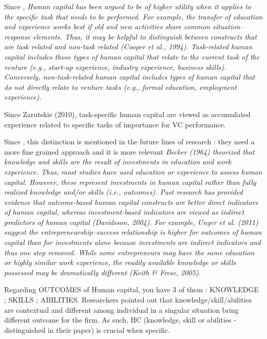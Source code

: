 Since \citep{marvel2016human}, \textit{Human capital has been argued to be of higher utility when it applies to the specific task that needs to be performed. For example, the transfer of education and experience works best if old and new activities share common situation–response elements. Thus, it may be helpful to distinguish between constructs that are task related and non-task related (Cooper et al., 1994). Task-related human capital includes those types of human capital that relate to the current task of the venture (e.g., start-up experience, industry experience, business skills). Conversely, non-task-related human capital includes types of human capital that do not directly relate to venture tasks (e.g., formal education, employment experience).}\newline

Since Zarutskie (2010), task-specific human capital are viewed as accumulated experience related to specific tasks of importance for VC performance.

Since \citep{marvel2016human}, this distinction is mentioned in the future lines of research : they need a more fine grained approach and it is more relevant \textit{Becker (1964) theorized that knowledge and skills are the result of investments in education and work experience. Thus, most studies have used education or experience to assess human capital. However, these represent investments in human capital rather than fully realized knowledge and/or skills (i.e., outcomes). Past research has provided evidence that outcome-based human capital constructs are better direct indicators of human capital, whereas investment-based indicators are viewed as indirect predictors of human capital (Davidsson, 2004). For example, Unger et al. (2011) suggest the entrepreneurship–success relationship is higher for outcomes of human capital than for investments alone because investments are indirect indicators and thus one step removed. While some entrepreneurs may have the same education or highly similar work experience, the readily available knowledge or skills possessed may be dramatically different (Keith & Frese, 2005).}\newline

Regarding OUTCOMES of Human capital, you have 3 of them \citep{marvel2016human} : KNOWLEDGE ; SKILLS ; ABILITIES. Researchers pointed out that knowledge/skill/abilities are contextual and different among individual in a singular situation bring different outcome for the firm. As such, HC (knowledge, skill or abilities - distinguished in their paper) is crucial when specific. \newline

